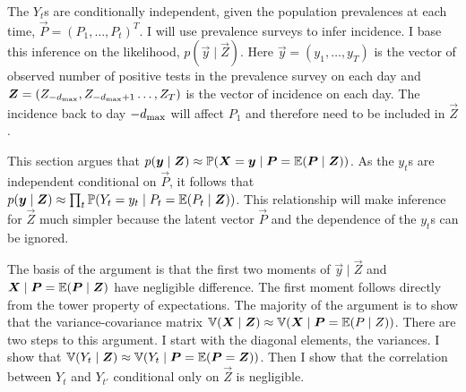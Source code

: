 \documentclass[thesis.tex]{subfiles}
\begin{document}
The $Y_t$s are conditionally independent, given the population prevalences at each time, $\vec{P} = (P_1, \dots, P_t)^T$. 
I will use prevalence surveys to infer incidence.
I base this inference on the likelihood, $p(\vec{y} \mid \vec{Z})$.
Here $\vec{y} = (y_1, \dots, y_T)$ is the vector of observed number of positive tests in the prevalence survey on each day and $\bm{Z} = (Z_{-d_\text{max}}, Z_{-d_\text{max}+1} \dots, Z_T)$ is the vector of incidence on each day.
The incidence back to day $-d_\text{max}$ will affect $P_1$ and therefore need to be included in $\vec{Z}$. 

This section argues that $p(\bm{y} \mid \bm{Z}) \approx \operatorname{\mathbb{P}}(\bm{X} = \bm{y} \mid \bm{P} = \operatorname{\mathbb{E}}(\bm{P} \mid \bm{Z}))$.
As the $y_t$s are independent conditional on $\vec{P}$, it follows that $p(\bm{y} \mid \bm{Z}) \approx \prod_t \operatorname{\mathbb{P}}(Y_t = y_t \mid P_t = \operatorname{\mathbb{E}}(P_t \mid \bm{Z}))$.
This relationship will make inference for $\vec{Z}$ much simpler because the latent vector $\vec{P}$ and the dependence of the $y_t$s can be ignored.

The basis of the argument is that the first two moments of $\vec{y} \mid \vec{Z}$ and $\bm{X} \mid \bm{P} = \operatorname{\mathbb{E}}(\bm{P} \mid \bm{Z})$ have negligible difference.
The first moment follows directly from the tower property of expectations.
The majority of the argument is to show that the variance-covariance matrix $\operatorname{\mathbb{V}}(\bm{X} \mid \bm{Z}) \approx \operatorname{\mathbb{V}}(\bm{X} \mid \bm{P} = \operatorname{\mathbb{E}}(P \mid Z))$.
There are two steps to this argument.
I start with the diagonal elements, the variances.
I show that $\operatorname{\mathbb{V}}(Y_t \mid \bm{Z}) \approx \operatorname{\mathbb{V}}(Y_t \mid \bm{P} = \operatorname{\mathbb{E}}(\bm{P} = \bm{Z}))$.
Then I show that the correlation between $Y_t$ and $Y_{t'}$ conditional only on $\vec{Z}$ is negligible.
\end{document}
